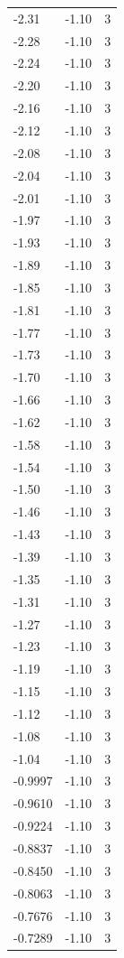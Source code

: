 \begin{longtable}{lrr}
  -2.31 & -1.10 & 3 \\
  -2.28 & -1.10 & 3 \\
  -2.24 & -1.10 & 3 \\
  -2.20 & -1.10 & 3 \\
  -2.16 & -1.10 & 3 \\
  -2.12 & -1.10 & 3 \\
  -2.08 & -1.10 & 3 \\
  -2.04 & -1.10 & 3 \\
  -2.01 & -1.10 & 3 \\
  -1.97 & -1.10 & 3 \\
  -1.93 & -1.10 & 3 \\
  -1.89 & -1.10 & 3 \\
  -1.85 & -1.10 & 3 \\
  -1.81 & -1.10 & 3 \\
  -1.77 & -1.10 & 3 \\
  -1.73 & -1.10 & 3 \\
  -1.70 & -1.10 & 3 \\
  -1.66 & -1.10 & 3 \\
  -1.62 & -1.10 & 3 \\
  -1.58 & -1.10 & 3 \\
  -1.54 & -1.10 & 3 \\
  -1.50 & -1.10 & 3 \\
  -1.46 & -1.10 & 3 \\
  -1.43 & -1.10 & 3 \\
  -1.39 & -1.10 & 3 \\
  -1.35 & -1.10 & 3 \\
  -1.31 & -1.10 & 3 \\
  -1.27 & -1.10 & 3 \\
  -1.23 & -1.10 & 3 \\
  -1.19 & -1.10 & 3 \\
  -1.15 & -1.10 & 3 \\
  -1.12 & -1.10 & 3 \\
  -1.08 & -1.10 & 3 \\
  -1.04 & -1.10 & 3 \\
  -0.9997 & -1.10 & 3 \\
  -0.9610 & -1.10 & 3 \\
  -0.9224 & -1.10 & 3 \\
  -0.8837 & -1.10 & 3 \\
  -0.8450 & -1.10 & 3 \\
  -0.8063 & -1.10 & 3 \\
  -0.7676 & -1.10 & 3 \\
  -0.7289 & -1.10 & 3 \\

\end{longtable}
